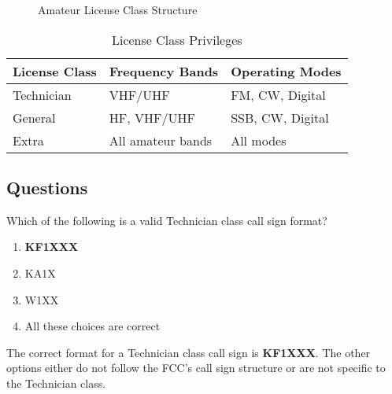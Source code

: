 \begin{figure}[h]
    \centering
    \caption{Amateur License Class Structure}
    \label{fig:license_structure}
\end{figure}

\begin{table}[h]
    \centering
    \caption{License Class Privileges}
    \label{tab:license_privileges}
    \begin{tabular}{|l|l|l|}
        \hline
        \textbf{License Class} & \textbf{Frequency Bands} & \textbf{Operating Modes} \\
        \hline
        Technician & VHF/UHF & FM, CW, Digital \\
        General & HF, VHF/UHF & SSB, CW, Digital \\
        Extra & All amateur bands & All modes \\
        \hline
    \end{tabular}
\end{table}

\subsection*{Questions}

\begin{tcolorbox}[colback=gray!10!white,colframe=black!75!black,title={T1C05}]
    Which of the following is a valid Technician class call sign format?
    \begin{enumerate}[label=\Alph*),noitemsep]
        \item \textbf{KF1XXX}
        \item KA1X
        \item W1XX
        \item All these choices are correct
    \end{enumerate}
\end{tcolorbox}
The correct format for a Technician class call sign is \textbf{KF1XXX}. The other options either do not follow the FCC's call sign structure or are not specific to the Technician class.


